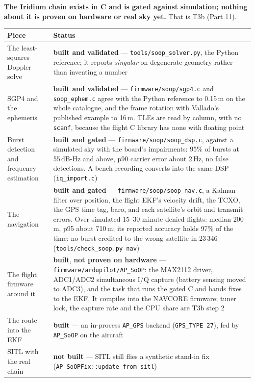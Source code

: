 \documentclass[11pt,a4paper]{article}
\newcommand{\file}[1]{\texttt{\small #1}}
\newcommand{\flag}[1]{\textcolor{warnred}{\textbf{#1}}}
\newcommand{\good}[1]{\textcolor{okgreen}{\textbf{#1}}}
\begin{document}
\textbf{The Iridium chain exists in C and is gated against simulation; nothing about it is
proven on hardware or real sky yet.} That is T3b (Part 11).

\begin{center}
\begin{tabular}{@{}P{0.29\textwidth}P{0.61\textwidth}@{}}
\toprule
\textbf{Piece} & \textbf{Status} \\
\midrule
The least-squares Doppler solve & \good{built and validated} --- \file{tools/soop\_solver.py},
the Python reference; it reports \emph{singular} on degenerate geometry rather than
inventing a number \\
SGP4 and the ephemeris & \good{built and validated} --- \file{firmware/soop/sgp4.c} and
\file{soop\_ephem.c} agree with the Python reference to 0.15\,m on the whole catalogue, and
the frame rotation with Vallado's published example to 16\,m. TLEs are read by column,
with no \file{scanf}, because the flight C library has none with floating point \\
Burst detection and frequency estimation & \good{built and gated} ---
\file{firmware/soop/soop\_dsp.c}, against a simulated sky with the board's impairments: 95\%
of bursts at 55\,dB-Hz and above, p90 carrier error about 2\,Hz, no false detections. A bench
recording converts into the same DSP (\file{iq\_import.c}) \\
The navigation & \good{built and gated} --- \file{firmware/soop/soop\_nav.c}, a Kalman filter
over position, the flight EKF's velocity drift, the TCXO, the GPS time tag, baro, and each
satellite's orbit and transmit errors. Over simulated 15--30 minute denied flights: median
200\,m, p95 about 710\,m; its reported accuracy holds 97\% of the time; no burst credited to
the wrong satellite in 23\,346 (\file{tools/check\_soop.py nav}) \\
The flight firmware around it & \good{built}, \flag{not proven on hardware} ---
\file{firmware/ardupilot/AP\_SoOP}: the MAX2112 driver, ADC1/ADC2 simultaneous I/Q capture
(battery sensing moved to ADC3), and the task that runs the gated C and hands fixes to the
EKF. It compiles into the NAVCORE firmware; tuner lock, the capture rate and the CPU share
are T3b step 2 \\
The route into the EKF & \good{built} --- an in-process \file{AP\_GPS} backend
(\file{GPS\_TYPE 27}), fed by \file{AP\_SoOP} on the aircraft \\
SITL with the real chain & \flag{not built} --- SITL still flies a synthetic stand-in fix
(\file{AP\_SoOPFix::update\_from\_sitl}) \\
\bottomrule
\end{tabular}
\end{center}
\end{document}

